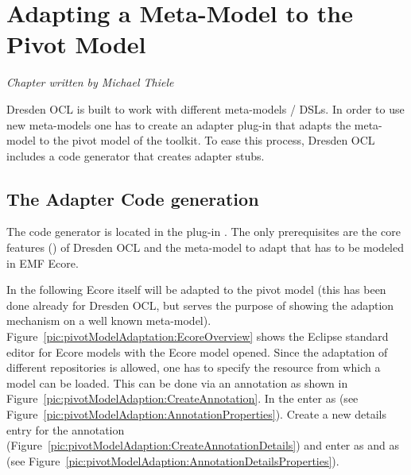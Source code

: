 \chapter{Adapting a Meta-Model to the Pivot Model}
\label{chapter:pivotModelAdaptation}

\begin{flushright}
\textit{Chapter written by Michael Thiele}
\end{flushright}

Dresden OCL is built to work with different meta-models / \acs{DSL}s. In order to
use new meta-models one has to create an adapter plug-in that adapts the
meta-model to the pivot model of the toolkit. To ease this process, Dresden OCL
includes a code generator that creates adapter stubs.



\section{The Adapter Code generation}

The code generator is located in the plug-in 
. The only prerequisites are 
the core features () of Dresden OCL and
the meta-model to adapt that has to be modeled in \acs{EMF} Ecore.

In the following Ecore itself will be adapted to the pivot model (this has been 
done already for Dresden OCL, but serves the purpose of showing the adaption
mechanism on a well known meta-model). 
Figure~\ref{pic:pivotModelAdaptation:EcoreOverview} shows the Eclipse standard 
editor for Ecore models with the Ecore model opened. Since the adaptation of 
different repositories is allowed, one has to specify the resource from which a 
model can be loaded. This can be done via an annotation as shown in 
Figure~\ref{pic:pivotModelAdaption:CreateAnnotation}. In the  enter  as 
 (see Figure~\ref{pic:pivotModelAdaption:AnnotationProperties}). 
Create a new details entry for the annotation 
(Figure~\ref{pic:pivotModelAdaption:CreateAnnotationDetails}) and enter 
 as  and 
as  (see 
Figure~\ref{pic:pivotModelAdaption:AnnotationDetailsProperties}).

